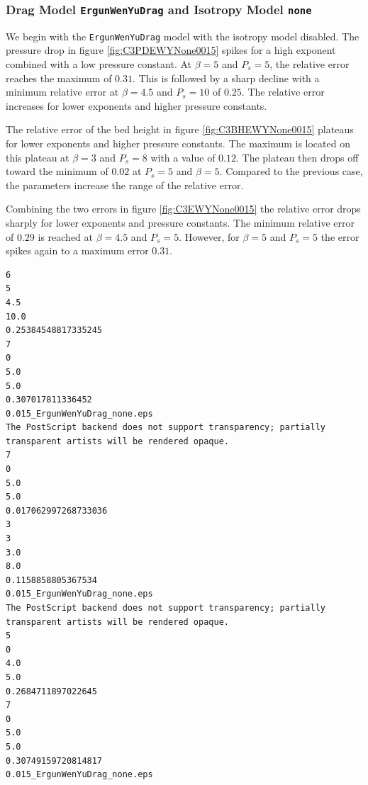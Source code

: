 \subsubsection{Drag Model \lstinline|ErgunWenYuDrag| and Isotropy Model \lstinline|none|}

We begin with the \lstinline|ErgunWenYuDrag| model with the isotropy model disabled.
The pressure drop in figure \ref{fig:C3PDEWYNone0015} spikes for a high exponent combined with a low pressure constant. At $\beta = 5$ and $P_s = 5$, the relative error reaches the maximum of $0.31$.
This is followed by a sharp decline with a minimum relative error at $\beta = 4.5$ and $P_s = 10$ of $0.25$.
The relative error increases for lower exponents and higher pressure constants.

The relative error of the bed height in figure \ref{fig:C3BHEWYNone0015} plateaus for lower exponents and higher pressure constants. 
The maximum is located on this plateau at $\beta = 3$ and $P_s = 8$ with a value of $0.12$.
The plateau then drops off toward the minimum of $0.02$ at $P_s = 5$ and $\beta = 5$.
Compared to the previous case, the parameters increase the range of the relative error.

Combining the two errors in figure \ref{fig:C3EWYNone0015} the relative error drops sharply for lower exponents and pressure constants.
The minimum relative error of $0.29$ is reached at $\beta = 4.5$ and $P_s = 5$.
However, for $\beta = 5$ and $P_s = 5$ the error spikes again to a maximum error $0.31$.
\ifcode
\begin{lstlisting}
6
5
4.5
10.0
0.25384548817335245
7
0
5.0
5.0
0.307017811336452
0.015_ErgunWenYuDrag_none.eps
The PostScript backend does not support transparency; partially transparent artists will be rendered opaque.
7
0
5.0
5.0
0.017062997268733036
3
3
3.0
8.0
0.1158858805367534
0.015_ErgunWenYuDrag_none.eps
The PostScript backend does not support transparency; partially transparent artists will be rendered opaque.
5
0
4.0
5.0
0.2684711897022645
7
0
5.0
5.0
0.30749159720814817
0.015_ErgunWenYuDrag_none.eps

\end{lstlisting}
\fi

